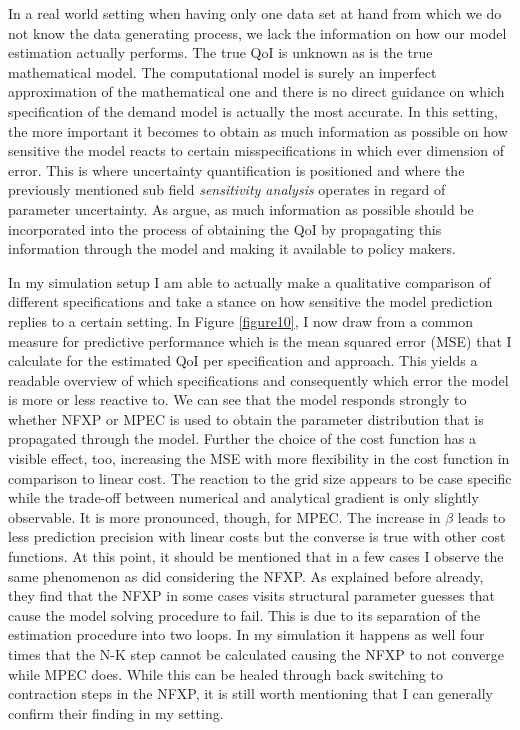 In a real world setting when having only one data set at hand from which we do not know the data generating process, we lack the information on how our model estimation actually performs. The true QoI is unknown as is the true mathematical model. The computational model is surely an imperfect approximation of the mathematical one and there is no direct guidance on which specification of the demand model is actually the most accurate. In this setting, the more important it becomes to obtain as much information as possible on how sensitive the model reacts to certain misspecifications in which ever dimension of error. This is where uncertainty quantification is positioned and where the previously mentioned sub field \textit{sensitivity analysis} operates in regard of parameter uncertainty. As \cite{Oberkampf.2010} argue, as much information as possible should be incorporated into the process of obtaining the QoI by propagating this information through the model and making it available to policy makers.

In my simulation setup I am able to actually make a qualitative comparison of different specifications and take a stance on how sensitive the model prediction replies to a certain setting. In Figure \ref{figure10}, I now draw from a common measure for predictive performance which is the mean squared error (MSE) that I calculate for the estimated QoI per specification and approach. This yields a readable overview of which specifications and consequently which error the model is more or less reactive to. We can see that the model responds strongly to whether NFXP or MPEC is used to obtain the parameter distribution that is propagated through the model. Further the choice of the cost function has a visible effect, too, increasing the MSE with more flexibility in the cost function in comparison to linear cost. The reaction to the grid size appears to be case specific while the trade-off between numerical and analytical gradient is only slightly observable. It is more pronounced, though, for MPEC. The increase in $\beta$ leads to less prediction precision with linear costs but the converse is true with other cost functions. At this point, it should be mentioned that in a few cases I observe the same phenomenon as \cite{Dong.Hsieh.Zhang.2017} did considering the NFXP. As explained before already, they find that the NFXP in some cases visits structural parameter guesses that cause the model solving procedure to fail. This is due to its separation of the estimation procedure into two loops. In my simulation it happens as well four times that the N-K step cannot be calculated causing the NFXP to not converge while MPEC does. While this can be healed through back switching to contraction steps in the NFXP, it is still worth mentioning that I can generally confirm their finding in my setting.


